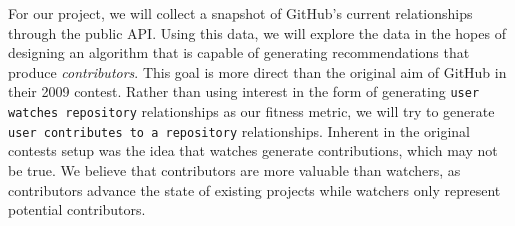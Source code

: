 \documentclass{article}
\begin{document}
  For our project, we will collect a snapshot of GitHub's current relationships through the public API. Using this data, we will explore the data in the hopes of designing an algorithm that is capable of generating recommendations that produce \emph{contributors}. This goal is more direct than the original aim of GitHub in their 2009 contest. Rather than using interest in the form of generating {\tt user watches repository} relationships as our fitness metric, we will try to generate {\tt user contributes to a repository} relationships. Inherent in the original contests setup was the idea that watches generate contributions, which may not be true. We believe that contributors are more valuable than watchers, as contributors advance the state of existing projects while watchers only represent potential contributors.
  
\end{document}
